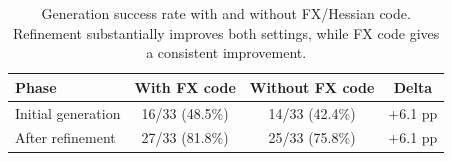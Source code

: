 \begin{table}[t]
\centering
\caption{Generation success rate with and without FX/Hessian code. Refinement substantially improves both settings, while FX code gives a consistent improvement.}
\label{tab:generation-success-fx}
\begin{tabular}{lccc}
\toprule
Phase & With FX code & Without FX code & Delta \\
\midrule
Initial generation & 16/33 (48.5\%) & 14/33 (42.4\%) & +6.1 pp \\
After refinement & 27/33 (81.8\%) & 25/33 (75.8\%) & +6.1 pp \\
\bottomrule
\end{tabular}
\end{table}
